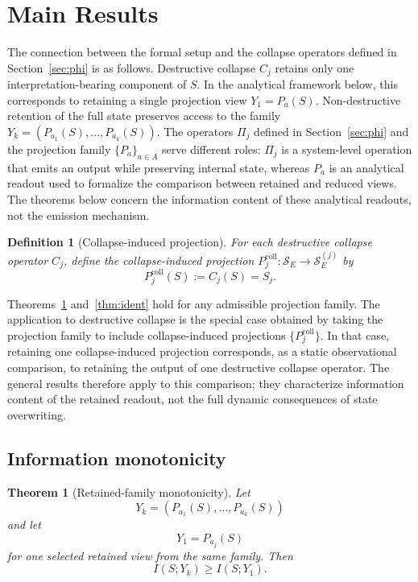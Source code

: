 \documentclass[11pt,a4paper]{article}
\newtheorem{definition}{Definition}
\newtheorem{theorem}{Theorem}
\begin{document}
\section{Main Results}
\label{sec:results}

The connection between the formal setup and the collapse operators defined in Section~\ref{sec:phi} is as follows. Destructive collapse $C_j$ retains only one interpretation-bearing component of $S$. In the analytical framework below, this corresponds to retaining a single projection view $Y_1 = P_a(S)$. Non-destructive retention of the full state preserves access to the family $Y_k = (P_{a_1}(S), \ldots, P_{a_k}(S))$. The operators $\Pi_j$ defined in Section~\ref{sec:phi} and the projection family $\{P_a\}_{a \in A}$ serve different roles: $\Pi_j$ is a system-level operation that emits an output while preserving internal state, whereas $P_a$ is an analytical readout used to formalize the comparison between retained and reduced views. The theorems below concern the information content of these analytical readouts, not the emission mechanism.

\begin{definition}[Collapse-induced projection]
\label{def:collapse_proj}
For each destructive collapse operator $C_j$, define the collapse-induced projection $P_j^{\mathrm{coll}} : \mathcal{S}_E \to \mathcal{S}_E^{(j)}$ by
\begin{equation}
P_j^{\mathrm{coll}}(S) := C_j(S) = S_j.
\end{equation}
\end{definition}

Theorems~\ref{thm:monotonicity} and~\ref{thm:ident} hold for any admissible projection family. The application to destructive collapse is the special case obtained by taking the projection family to include collapse-induced projections $\{P_j^{\mathrm{coll}}\}$. In that case, retaining one collapse-induced projection corresponds, as a static observational comparison, to retaining the output of one destructive collapse operator. The general results therefore apply to this comparison; they characterize information content of the retained readout, not the full dynamic consequences of state overwriting.

\subsection{Information monotonicity}

\begin{theorem}[Retained-family monotonicity]
\label{thm:monotonicity}
Let
\begin{equation}
Y_k = (P_{a_1}(S), \ldots, P_{a_k}(S))
\end{equation}
and let
\begin{equation}
Y_1 = P_{a_j}(S)
\end{equation}
for one selected retained view from the same family. Then
\begin{equation}
I(S;Y_k) \geq I(S;Y_1).
\end{equation}
\end{theorem}
\end{document}
